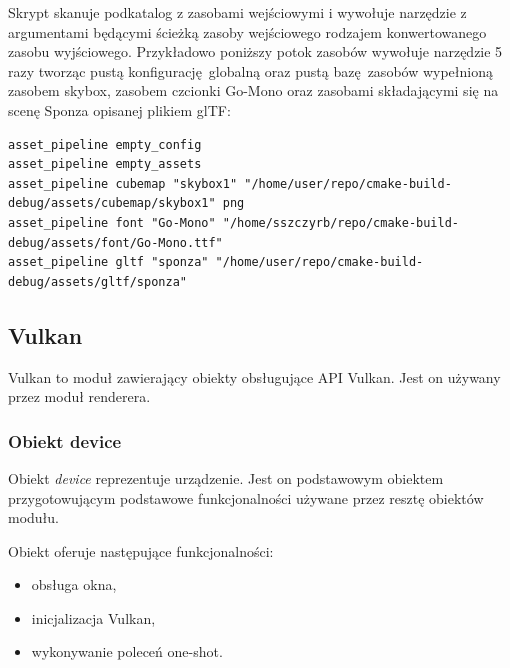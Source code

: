 Skrypt skanuje podkatalog z zasobami wejściowymi i wywołuje narzędzie z argumentami będącymi ścieżką zasoby wejściowego rodzajem konwertowanego zasobu wyjściowego.
Przykładowo poniższy potok zasobów wywołuje narzędzie 5 razy tworząc pustą konfigurację globalną oraz pustą bazę zasobów wypełnioną zasobem skybox, zasobem czcionki Go-Mono oraz zasobami składającymi się na scenę Sponza opisanej plikiem glTF:
\lstset{language=verbatim}
\begin{lstlisting}[caption={Komeny wywoływane przez przykładowy potok zasobów},captionpos=b]
asset_pipeline empty_config
asset_pipeline empty_assets
asset_pipeline cubemap "skybox1" "/home/user/repo/cmake-build-debug/assets/cubemap/skybox1" png
asset_pipeline font "Go-Mono" "/home/sszczyrb/repo/cmake-build-debug/assets/font/Go-Mono.ttf"
asset_pipeline gltf "sponza" "/home/user/repo/cmake-build-debug/assets/gltf/sponza"
\end{lstlisting}

\subsection{Vulkan}

Vulkan to moduł zawierający obiekty obsługujące API Vulkan.
Jest on używany przez moduł renderera.

\subsubsection{Obiekt device}
Obiekt \textit{device} reprezentuje urządzenie.
Jest on podstawowym obiektem przygotowującym podstawowe funkcjonalności używane przez resztę obiektów modułu.


Obiekt oferuje następujące funkcjonalności:
\begin{itemize}
	\item obsługa okna,
	\item inicjalizacja Vulkan,
	\item wykonywanie poleceń one-shot.
\end{itemize}

